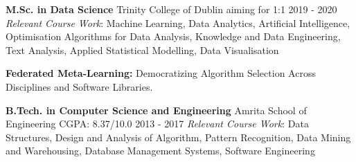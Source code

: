 \begin{cventries}
  \cventry
    {\textbf{M.Sc. in Data Science}}
    {Trinity College of Dublin}
    {aiming for 1:1}
    {2019 - 2020}
    {\textit{Relevant Course Work}: Machine Learning, Data Analytics, Artificial Intelligence, Optimisation Algorithms for Data Analysis, Knowledge and Data Engineering, Text Analysis, Applied Statistical Modelling, Data Visualisation}
    
  \begin{cvskills}
    {\textbf{Federated Meta-Learning:} Democratizing Algorithm Selection Across Disciplines and Software Libraries.}
  \end{cvskills}
  
  \cventry
    {\textbf{B.Tech. in Computer Science and Engineering}}
    {Amrita School of Engineering}
    {CGPA: 8.37/10.0}
    {2013 - 2017}
    {\textit{Relevant Course Work}: Data Structures, Design and Analysis of Algorithm, Pattern Recognition, Data Mining and Warehousing, Database Management Systems, Software Engineering}
\end{cventries}
